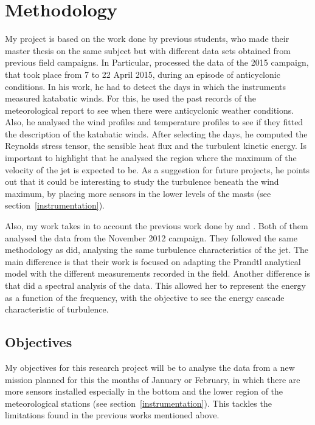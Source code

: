 \documentclass[a4paper,12pt]{article}
\begin{document}
\section{Methodology}
My project is based on the work done by previous students, who made their master thesis on the same subject but with different data sets obtained from previous field campaigns. In Particular, \cite{jakob} processed the data of the 2015 campaign, that took place from 7 to 22 April 2015, during an episode of anticyclonic conditions. In his work, he had to detect the days in which the instruments measured katabatic winds. For this, he used the past records of the meteorological report to see when there were anticyclonic weather conditions. Also, he analysed the wind profiles and temperature profiles to see if they fitted the description of the katabatic winds. After selecting the days, he computed the Reynolds stress tensor, the sensible heat flux and the turbulent kinetic energy. Is important to highlight that he analysed the region where the maximum of the velocity of the jet is expected to be. As a suggestion for future projects, he points out that it could be interesting to study the turbulence beneath the wind maximum, by placing more sensors in the lower levels of the masts (see section~\ref{instrumentation}).

Also, my work takes in to account the previous work done by \cite{claudine} and \cite{alban}. Both of them analysed the data from the November 2012 campaign. They followed the same methodology as \citeauthor{jakob} did, analysing the same turbulence characteristics of the jet. The main difference is that their work is focused on adapting the Prandtl analytical model with the different measurements recorded in the field. Another difference is that \citeauthor{claudine} did a spectral analysis of the data. This allowed her to represent the energy as a function of the frequency, with the objective to see the energy cascade characteristic of turbulence. 

\subsection{Objectives}
My objectives for this research project will be to analyse the data from a new mission planned for this the months of January or February, in which there are more sensors installed especially in the bottom and the lower region of the meteorological stations (see section~\ref{instrumentation}). This tackles the limitations found in the previous works mentioned above. 
\end{document}
